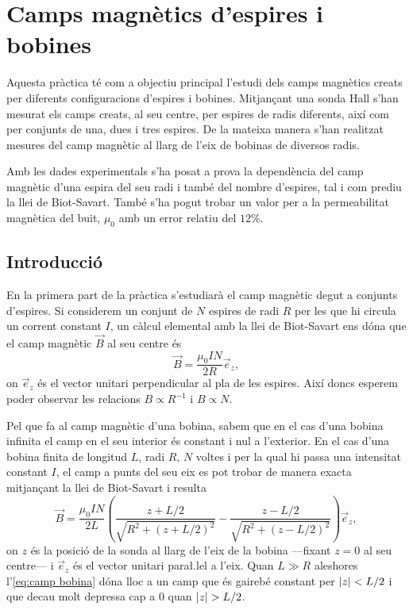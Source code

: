 \chapter{Camps magnètics d'espires i bobines}
\begin{resum}
Aquesta pràctica té com a objectiu principal l'estudi dels camps magnètics creats per diferents configuracions d'espires i bobines. Mitjançant una sonda Hall s'han mesurat els camps creats, al seu centre, per espires de radis diferents, així com per conjunts de una, dues i tres espires. De la mateixa manera s'han realitzat mesures del camp magnètic al llarg de l'eix de bobinas de diversos radis.

Amb les dades experimentals s'ha posat a prova la dependència del camp magnètic d'una espira del seu radi i també del nombre d'espires, tal i com prediu la llei de Biot-Savart. També s'ha pogut trobar un valor per a la permeabilitat magnètica del buit, \( \mu_0 \) amb un error relatiu del $12\%$.
\end{resum}


\section{Introducció}
En la primera part de la pràctica s'estudiarà el camp magnètic degut a conjunts d'espires. Si considerem un conjunt de \( N \) espires de radi \( R \) per les que hi circula un corrent constant \( I \), un càlcul elemental amb la llei de Biot-Savart ens dóna que el camp magnètic \( \vec{B} \) al seu centre és
\begin{equation}\label{eq:camp espira}
  \vec{B}=\frac{\mu_0 I N}{2 R}\vec{e}_z,
\end{equation}
on \( \vec{e}_z \) és el vector unitari perpendicular al pla de les espires. Així doncs esperem poder observar les relacions \( B \propto R^{-1} \) i \( B \propto N \). 

Pel que fa al camp magnètic d'una bobina, sabem que en el cas d'una bobina infinita el camp en el seu interior és constant i nul a l'exterior. En el cas d'una bobina finita de longitud \( L \), radi \( R \), \( N \) voltes i per la qual hi passa una intensitat constant \( I \), el camp a punts del seu eix es pot trobar de manera exacta mitjançant la llei de Biot-Savart i resulta
\begin{equation}\label{eq:camp bobina}
  \vec{B}=\frac{\mu_0 I N}{2 L}\left(\frac{z + L/2}{\sqrt{R^2+(z+L/2)^2}} - \frac{z - L/2}{\sqrt{R^2 + (z - L/2)^2}}\right) \vec{e}_z,
\end{equation}
on \( z \) és la posició de la sonda al llarg de l'eix de la bobina ---fixant \( z = 0 \) al seu centre--- i \( \vec{e}_z \) és el vector unitari para\l.lel a l'eix. Quan \( L \gg R \) aleshores l'\cref{eq:camp bobina} dóna lloc a un camp que és gairebé constant per \( \left\lvert z \right\rvert < L/2 \) i que decau molt depressa cap a 0 quan \( \left\lvert z \right\rvert > L/2 \). 

